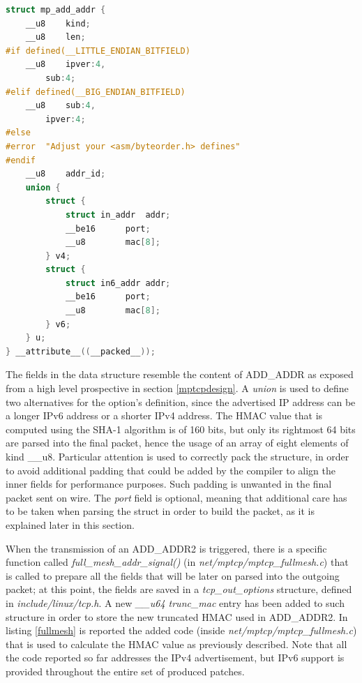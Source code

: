 \begin{lstlisting}[language=c, caption=\textit{mp\_add\_addr struct in the kernel}, label=mpaddaddr]
struct mp_add_addr {
	__u8	kind;
	__u8	len;
#if defined(__LITTLE_ENDIAN_BITFIELD)
	__u8	ipver:4,
		sub:4;
#elif defined(__BIG_ENDIAN_BITFIELD)
	__u8	sub:4,
		ipver:4;
#else
#error	"Adjust your <asm/byteorder.h> defines"
#endif
	__u8	addr_id;
	union {
		struct {
			struct in_addr	addr;
			__be16		port;
			__u8		mac[8];
		} v4;
		struct {
			struct in6_addr	addr;
			__be16		port;
			__u8		mac[8];
		} v6;
	} u;
} __attribute__((__packed__));
\end{lstlisting}

The fields in the data structure resemble the content of ADD\_ADDR as exposed from a high level prospective in section \ref{mptcpdesign}. 
A \textit{union} is used to define two alternatives for the option's definition, since the advertised IP address can be a longer IPv6 address or a shorter IPv4 address. 
The HMAC value that is computed using the SHA-1 algorithm is of 160 bits, but only its rightmost 64 bits are parsed into the final packet, hence the usage of an array of eight elements of kind \_\_u8.  
Particular attention is used to correctly pack the structure, in order to avoid additional padding that could be added by the compiler to align the inner fields for performance purposes. Such padding is unwanted in the final packet sent on wire. The \textit{port} field is optional, meaning that additional care has to be taken when parsing the struct in order to build the packet, as it is explained later in this section.

When the transmission of an ADD\_ADDR2 is triggered, there is a specific function called \textit{full\_mesh\_addr\_signal()} (in \textit{net/mptcp/mptcp\_fullmesh.c}) that is called to prepare all the fields that will be later on parsed into the outgoing packet; at this point, the fields are saved in a \textit{tcp\_out\_options} structure, defined in \textit{include/linux/tcp.h}. A new \textit{\_\_u64 trunc\_mac} entry has been added to such structure in order to store the new truncated HMAC used in ADD\_ADDR2. 
In listing \ref{fullmesh} is reported the added code (inside \textit{net/mptcp/mptcp\_fullmesh.c}) that is used to calculate the HMAC value as previously described. Note that all the code reported so far addresses the IPv4 advertisement, but IPv6 support is provided throughout the entire set of produced patches.

